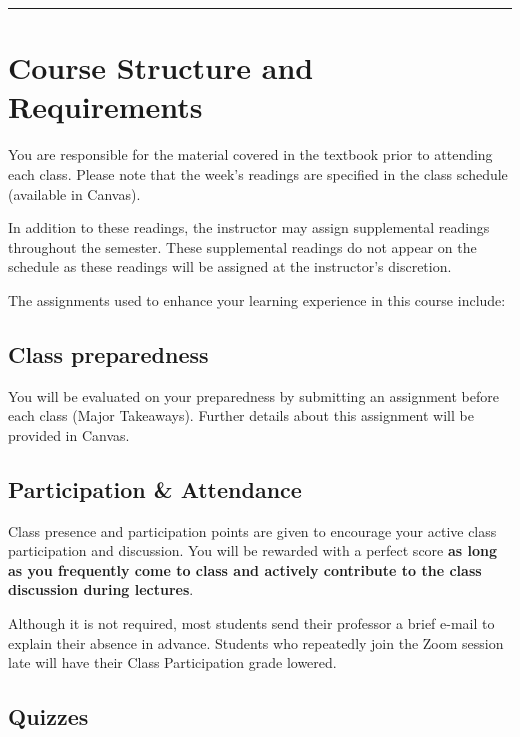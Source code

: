 \documentclass[11pt,]{article}
\begin{document}
\begin{center}\rule{0.5\linewidth}{0.5pt}\end{center}

\hypertarget{course-structure-and-requirements}{%
\section{Course Structure and
Requirements}\label{course-structure-and-requirements}}

You are responsible for the material covered in the textbook prior to
attending each class. Please note that the week's readings are specified
in the class schedule (available in Canvas).

In addition to these readings, the instructor may assign supplemental
readings throughout the semester. These supplemental readings do not
appear on the schedule as these readings will be assigned at the
instructor's discretion.

The assignments used to enhance your learning experience in this course
include:

\hypertarget{class-preparedness}{%
\subsection{Class preparedness}\label{class-preparedness}}

You will be evaluated on your preparedness by submitting an assignment
before each class (Major Takeaways). Further details about this
assignment will be provided in Canvas.

\hypertarget{participation-attendance}{%
\subsection{Participation \&
Attendance}\label{participation-attendance}}

Class presence and participation points are given to encourage your
active class participation and discussion. You will be rewarded with a
perfect score \textbf{as long as you frequently come to class and
actively contribute to the class discussion during lectures}.

Although it is not required, most students send their professor a brief
e-mail to explain their absence in advance. Students who repeatedly join
the Zoom session late will have their Class Participation grade lowered.

\hypertarget{quizzes}{%
\subsection{Quizzes}\label{quizzes}}
\end{document}
